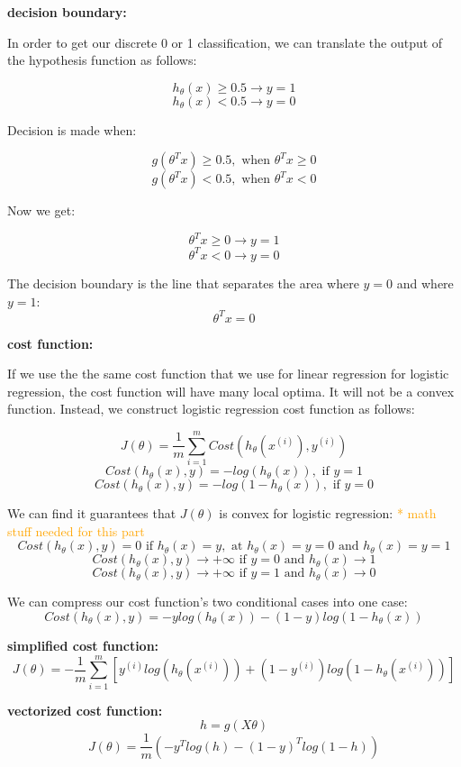 \documentclass{article}
\begin{document}
\noindent \textbf{decision boundary:}

\noindent In order to get our discrete 0 or 1 classification, we can translate the output of the hypothesis function as follows:

\[h_{\theta} (x) \geq 0.5 \rightarrow y = 1\]
\[h_{\theta} (x) < 0.5 \rightarrow y = 0\]

\noindent Decision is made when:

\[g(\theta^T x) \geq 0.5, \text{ when } \theta^T x \geq 0\]
\[g(\theta^T x) < 0.5, \text{ when } \theta^T x < 0\]

\noindent Now we get:

\[\theta^T x \geq 0 \rightarrow y = 1\]
\[\theta^T x < 0 \rightarrow y = 0\]

\noindent The decision boundary is the line that separates the area where \(y = 0\) and where \(y = 1\):
\[\theta^T x = 0\]

\noindent \textbf{cost function:}

\noindent If we use the the same cost function that we use for linear regression for logistic regression, the cost function will have many local optima. It will not be a convex function. Instead, we construct logistic regression cost function as follows:

\[J(\theta) = \frac{1}{m} \sum_{i = 1}^m Cost(h_{\theta}(x^{(i)}), y^{(i)})\]
\[Cost(h_{\theta}(x), y) = -log(h_{\theta}(x)), \text{ if } y = 1\]
\[Cost(h_{\theta}(x), y) = -log(1 - h_{\theta}(x)), \text{ if } y = 0\]

\noindent We can find it guarantees that \(J(\theta)\) is convex for logistic regression: \textcolor{orange}{ * math stuff needed for this part}
\[
Cost(h_{\theta}(x), y) = 0 \text{ if }
h_{\theta}(x) = y, \text{ at } h_{\theta}(x) = y = 0 \text{ and } 
h_{\theta}(x) = y = 1
\]
\[
Cost(h_{\theta}(x), y) \rightarrow +\infty
\text{ if } y = 0 \text{ and }
h_{\theta}(x) \rightarrow 1
\]
\[
Cost(h_{\theta}(x), y) \rightarrow +\infty
\text{ if } y = 1 \text{ and }
h_{\theta}(x) \rightarrow 0
\]

\noindent We can compress our cost function's two conditional cases into one case:
\[Cost(h_{\theta} (x), y) 
= - y log(h_{\theta} (x)) - (1 - y) log(1 - h_{\theta} (x))\]

\noindent \textbf{simplified cost function:}
\[J(\theta) = - \frac{1}{m} \sum_{i = 1}^{m} [y^{(i)} log(h_{\theta} (x^{(i)})) + (1 - y^{(i)}) log(1 - h_{\theta} (x^{(i)}))]\]

\noindent \textbf{vectorized cost function:}
\[h = g(X\theta)\]
\[J(\theta) = \frac{1}{m} (- y^T log(h) - (1 - y)^T log(1 - h))\]
\end{document}
